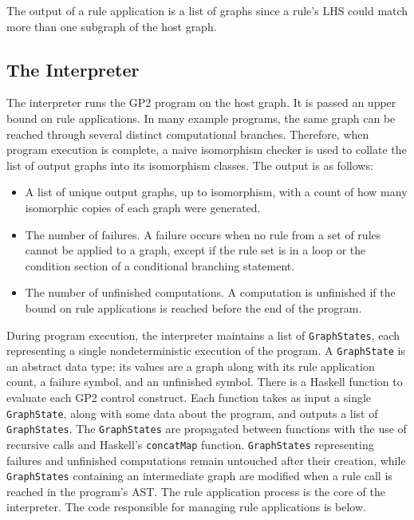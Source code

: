 The output of a rule application is a list of graphs since a rule's LHS could match more than one subgraph of the host graph.

\subsection{The Interpreter}

The interpreter runs the GP2 program on the host graph. It is passed an upper bound on rule applications. In many example programs, the same graph can be reached through several distinct computational branches. Therefore, when program execution is complete, a naive isomorphism checker is used to collate the list of output graphs into its isomorphism classes. The output is as follows:

\begin{itemize}
\item A list of unique output graphs, up to isomorphism, with a count of how many isomorphic copies of each graph were generated.
\item The number of failures. A failure occurs when no rule from a set of rules cannot be applied to a graph, except if the rule set is in a loop or the condition section of a conditional branching statement.
\item The number of unfinished computations. A computation is unfinished if the bound on rule applications is reached before the end of the program.
\end{itemize}

During program execution, the interpreter maintains a list of \texttt{GraphStates}, each representing a single nondeterministic execution of the program. A \texttt{GraphState} is an abstract data type: its values are a graph along with its rule application count, a failure symbol, and an unfinished symbol. There is a Haskell function to evaluate each GP2 control construct. Each function takes as input a single \texttt{GraphState}, along with some data about the program, and outputs a list of \texttt{GraphStates}. The \texttt{GraphStates} are propagated between functions with the use of recursive calls and Haskell's \texttt{concatMap} function. \texttt{GraphStates} representing failures and unfinished computations remain untouched after their creation, while \texttt{GraphStates} containing an intermediate graph are modified when a rule call is reached in the program's AST. The rule application process is the core of the interpreter. The code responsible for managing rule applications is below.

